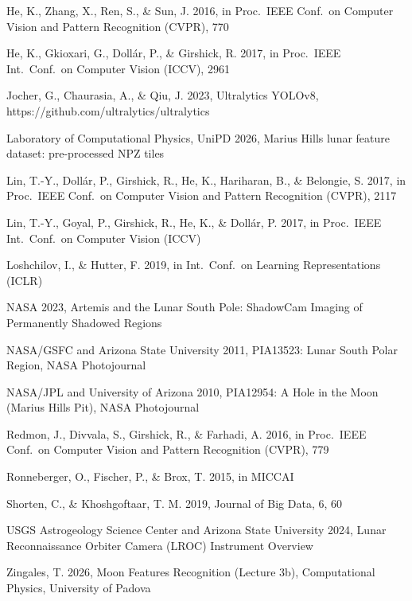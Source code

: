 \documentclass{aa}
\begin{document}
\begin{thebibliography}{}

 He, K., Zhang, X., Ren, S., \& Sun, J. 2016,
       in Proc.\ IEEE Conf.\ on Computer Vision and Pattern Recognition (CVPR), 770

 He, K., Gkioxari, G., Doll\'ar, P., \& Girshick, R. 2017,
       in Proc.\ IEEE Int.\ Conf.\ on Computer Vision (ICCV), 2961

 Jocher, G., Chaurasia, A., \& Qiu, J. 2023,
       Ultralytics YOLOv8, https://github.com/ultralytics/ultralytics

 Laboratory of Computational Physics, UniPD 2026,
       Marius Hills lunar feature dataset: pre-processed NPZ tiles

 Lin, T.-Y., Doll\'ar, P., Girshick, R., He, K., Hariharan, B., \& Belongie, S. 2017,
       in Proc.\ IEEE Conf.\ on Computer Vision and Pattern Recognition (CVPR), 2117

 Lin, T.-Y., Goyal, P., Girshick, R., He, K., \& Doll\'ar, P. 2017,
       in Proc.\ IEEE Int.\ Conf.\ on Computer Vision (ICCV)

 Loshchilov, I., \& Hutter, F. 2019,
       in Int.\ Conf.\ on Learning Representations (ICLR)

 NASA 2023,
       Artemis and the Lunar South Pole: ShadowCam Imaging of Permanently Shadowed Regions

 NASA/GSFC and Arizona State University 2011,
       PIA13523: Lunar South Polar Region, NASA Photojournal

 NASA/JPL and University of Arizona 2010,
       PIA12954: A Hole in the Moon (Marius Hills Pit), NASA Photojournal

 Redmon, J., Divvala, S., Girshick, R., \& Farhadi, A. 2016,
       in Proc.\ IEEE Conf.\ on Computer Vision and Pattern Recognition (CVPR), 779

 Ronneberger, O., Fischer, P., \& Brox, T. 2015,
       in MICCAI

 Shorten, C., \& Khoshgoftaar, T. M. 2019,
       Journal of Big Data, 6, 60

 USGS Astrogeology Science Center and Arizona State University 2024,
       Lunar Reconnaissance Orbiter Camera (LROC) Instrument Overview

 Zingales, T. 2026,
       Moon Features Recognition (Lecture 3b), Computational Physics, University of Padova

\end{thebibliography}
\end{document}
